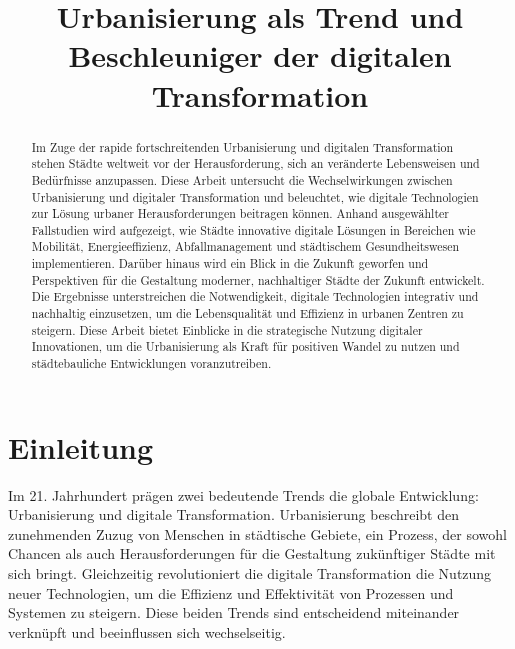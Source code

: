 \documentclass[conference,compsoc,final,a4paper, onecolumn, 11pt]{IEEEtran}
\newcommand{\dokumententitel}[0]{Urbanisierung als Trend und Beschleuniger der digitalen Transformation}
\begin{document}
\title{\dokumententitel}

\author{
  \and
  \and
}

\maketitle
\thispagestyle{plain}
\pagestyle{plain}

\begin{abstract}
Im Zuge der rapide fortschreitenden Urbanisierung und digitalen Transformation stehen Städte weltweit vor der Herausforderung, sich an veränderte Lebensweisen und Bedürfnisse anzupassen. 
Diese Arbeit untersucht die Wechselwirkungen zwischen Urbanisierung und digitaler Transformation und beleuchtet, wie digitale Technologien zur Lösung urbaner Herausforderungen beitragen können. 
Anhand ausgewählter Fallstudien wird aufgezeigt, wie Städte innovative digitale Lösungen in Bereichen wie Mobilität, Energieeffizienz, Abfallmanagement und städtischem Gesundheitswesen implementieren. 
Darüber hinaus wird ein Blick in die Zukunft geworfen und Perspektiven für die Gestaltung moderner, nachhaltiger Städte der Zukunft entwickelt. 
Die Ergebnisse unterstreichen die Notwendigkeit, digitale Technologien integrativ und nachhaltig einzusetzen, um die Lebensqualität und Effizienz in urbanen Zentren zu steigern. 
Diese Arbeit bietet Einblicke in die strategische Nutzung digitaler Innovationen, um die Urbanisierung als Kraft für positiven Wandel zu nutzen und städtebauliche Entwicklungen voranzutreiben.
\end{abstract}

{\tableofcontents}


\section{Einleitung}
Im 21. Jahrhundert prägen zwei bedeutende Trends die globale Entwicklung: Urbanisierung und digitale Transformation. 
Urbanisierung beschreibt den zunehmenden Zuzug von Menschen in städtische Gebiete, ein Prozess, der sowohl Chancen als auch Herausforderungen für die Gestaltung zukünftiger Städte mit sich bringt. 
Gleichzeitig revolutioniert die digitale Transformation die Nutzung neuer Technologien, um die Effizienz und Effektivität von Prozessen und Systemen zu steigern. 
Diese beiden Trends sind entscheidend miteinander verknüpft und beeinflussen sich wechselseitig.
\end{document}
